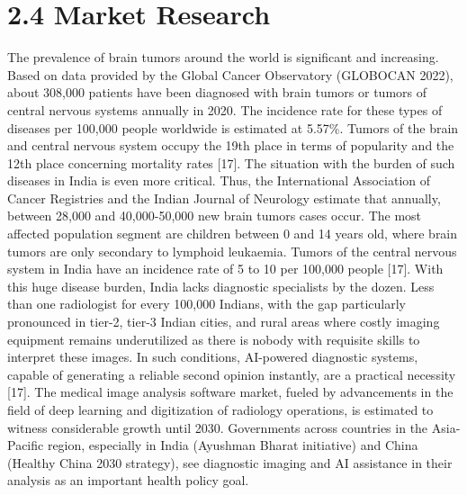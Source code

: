 \documentclass[12pt,a4paper,oneside]{report}
\begin{document}
\section{2.4 Market Research}
The prevalence of brain tumors around the world is significant and increasing. Based on data provided by the Global Cancer Observatory (GLOBOCAN 2022), about 308,000 patients have been diagnosed with brain tumors or tumors of central nervous systems annually in 2020. The incidence rate for these types of diseases per 100,000 people worldwide is estimated at 5.57\%. Tumors of the brain and central nervous system occupy the 19th place in terms of popularity and the 12th place concerning mortality rates [17].
The situation with the burden of such diseases in India is even more critical. Thus, the International Association of Cancer Registries and the Indian Journal of Neurology estimate that annually, between 28,000 and 40,000-50,000 new brain tumors cases occur. The most affected population segment are children between 0 and 14 years old, where brain tumors are only secondary to lymphoid leukaemia. Tumors of the central nervous system in India have an incidence rate of 5 to 10 per 100,000 people [17].
With this huge disease burden, India lacks diagnostic specialists by the dozen. Less than one radiologist for every 100,000 Indians, with the gap particularly pronounced in tier-2, tier-3 Indian cities, and rural areas where costly imaging equipment remains underutilized as there is nobody with requisite skills to interpret these images. In such conditions, AI-powered diagnostic systems, capable of generating a reliable second opinion instantly, are a practical necessity [17].
The medical image analysis software market, fueled by advancements in the field of deep learning and digitization of radiology operations, is estimated to witness considerable growth until 2030. Governments across countries in the Asia-Pacific region, especially in India (Ayushman Bharat initiative) and China (Healthy China 2030 strategy), see diagnostic imaging and AI assistance in their analysis as an important health policy goal.
\end{document}

